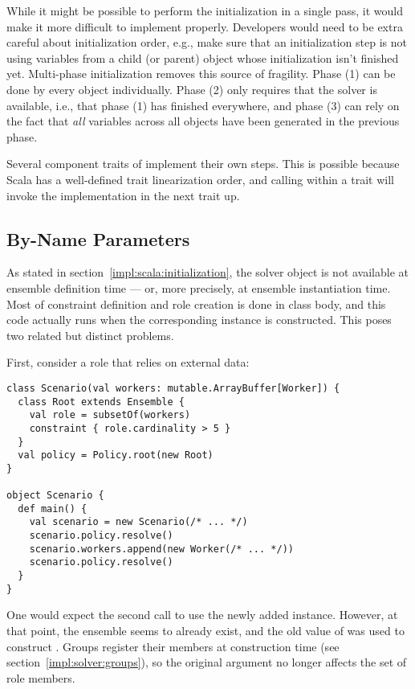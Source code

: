 While it might be possible to perform the initialization in a single pass, it would make
it more difficult to implement properly. Developers would need to be extra careful about
initialization order, e.g., make sure that an initialization step is not using variables
from a child (or parent) object whose initialization isn't finished yet. Multi-phase
initialization removes this source of fragility. Phase (1) can be done by every object
individually. Phase (2) only requires that the solver is available, i.e., that phase (1)
has finished everywhere, and phase (3) can rely on the fact that \textit{all} variables
across all objects have been generated in the previous phase.

\medskip

Several component traits of  implement their own  steps. This is
possible because Scala has a well-defined trait linearization order, and calling
 within a trait will invoke the  implementation in the next
trait up.


\subsection{By-Name Parameters}
\label{impl:scala:byname}

As stated in section~\ref{impl:scala:initialization}, the solver object is not available
at ensemble definition time --- or, more precisely, at ensemble instantiation time. Most
of constraint definition and role creation is done in class body, and this code actually
runs when the corresponding instance is constructed. This poses two related but distinct
problems.

First, consider a role that relies on external data:

\begin{lstlisting}[style=ensembles]
class Scenario(val workers: mutable.ArrayBuffer[Worker]) {
  class Root extends Ensemble {
    val role = subsetOf(workers)
    constraint { role.cardinality > 5 }
  }
  val policy = Policy.root(new Root)
}

object Scenario {
  def main() {
    val scenario = new Scenario(/* ... */)
    scenario.policy.resolve()
    scenario.workers.append(new Worker(/* ... */))
    scenario.policy.resolve()
  }
}
\end{lstlisting}

One would expect the second  call to use the newly added 
instance. However, at that point, the ensemble seems to already exist, and the old value
of  was used to construct . Groups register their members at
construction time (see section~\ref{impl:solver:groups}), so the original argument no
longer affects the set of role members.

